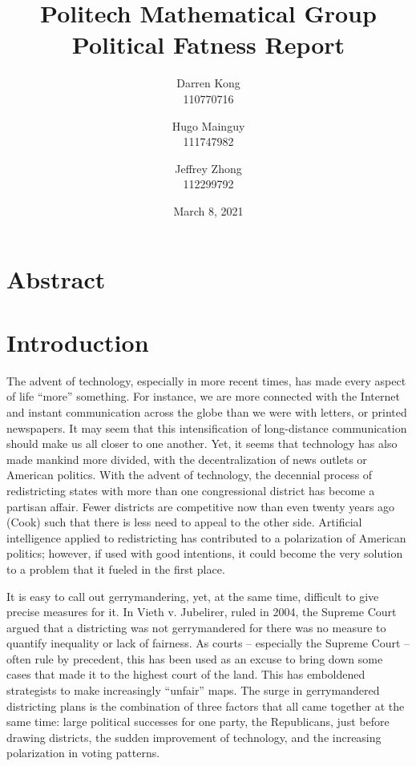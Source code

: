 \documentclass[letterpaper]{article}
\title{
	\textbf{Politech Mathematical Group} \\ 
	\vspace{2ex} 
	Political Fatness Report
	\vspace{2ex}
}
\author{
	Darren Kong \\ 110770716
	\and 
	Hugo Mainguy \\ 111747982
	\and 
	Jeffrey Zhong \\ 112299792
	\vspace{3ex}
}
\date{March 8, 2021}
\begin{document}
\begin{titlepage}
\maketitle
\thispagestyle{empty}
\end{titlepage}

\section{Abstract}

\section{Introduction}

The advent of technology, especially in more recent times, has made every aspect of life “more” something. For instance, we are more connected with the Internet and instant communication across the globe than we were with letters, or printed newspapers. It may seem that this intensification of long-distance communication should make us all closer to one another. Yet, it seems that technology has also made mankind more divided, with the decentralization of news outlets or American politics. With the advent of technology, the decennial process of redistricting states with more than one congressional district has become a partisan affair. Fewer districts are competitive now than even twenty years ago (Cook) such that there is less need to appeal to the other side. Artificial intelligence applied to redistricting has contributed to a polarization of American politics; however, if used with good intentions, it could become the very solution to a problem that it fueled in the first place.

It is easy to call out gerrymandering, yet, at the same time, difficult to give precise measures for it. In Vieth v. Jubelirer, ruled in 2004, the Supreme Court argued that a districting was not gerrymandered for there was no measure to quantify inequality or lack of fairness. As courts – especially the Supreme Court – often rule by precedent, this has been used as an excuse to bring down some cases that made it to the highest court of the land. This has emboldened strategists to make increasingly “unfair” maps. The surge in gerrymandered districting plans is the combination of three factors that all came together at the same time: large political successes for one party, the Republicans, just before drawing districts, the sudden improvement of technology, and the increasing polarization in voting patterns. 
\end{document}

